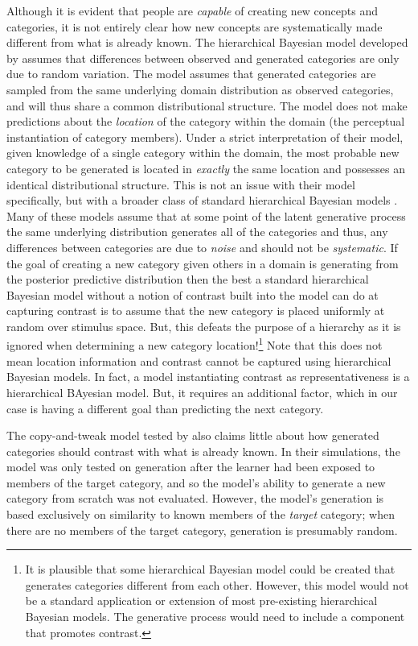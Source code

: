 \documentclass[12pt]{article}
\begin{document}
\begin{flushleft}
Although it is evident that people are {\em capable} of creating new concepts
and categories, it is not entirely clear how new concepts are systematically
made different from what is already known. The hierarchical Bayesian model
developed by \cite{jern2013probabilistic} assumes that differences between
observed and generated categories are only due to random variation. The model
assumes that generated categories are sampled from the same underlying domain
distribution as observed categories, and will thus share a common distributional
structure. The model does not make predictions about the {\em location} of the
category within the domain (the perceptual instantiation of category members).
Under a strict interpretation of their model, given knowledge of a single
category within the domain, the most probable new category to be generated is
located in {\em exactly} the same location and possesses an identical
distributional structure. This is not an issue with their model specifically,
but with a broader class of standard hierarchical Bayesian models \citep[e.g.,
][]{griffithsscn07,kemp07}. Many of these models assume that at some point of
the latent generative process the same underlying distribution generates all of
the categories and thus, any differences between categories are due to {\em
noise} and should not be {\em systematic}. If the goal of creating a new
category given others in a domain is generating from the posterior predictive
distribution then the best a standard hierarchical Bayesian model without a
notion of contrast built into the model can do at capturing contrast is to
assume that the new category is placed uniformly at random over stimulus space.
But, this defeats the purpose of a hierarchy as it is ignored when determining a
new category location!\footnote{It is plausible that some hierarchical Bayesian
model could be created that generates categories different from each other.
However, this model would not be a standard application or extension of most
pre-existing hierarchical Bayesian models. The generative process would need to
include a component that promotes contrast.} Note that this does not mean
location information and contrast cannot be captured using hierarchical Bayesian
models. In fact, a model instantiating contrast as representativeness is a
hierarchical BAyesian model. But, it requires an additional factor, which in our
case is having a different goal than predicting the next category.

The copy-and-tweak model tested by \cite{jern2013probabilistic} also claims
little about how generated categories should contrast with what is already
known. In their simulations, the model was only tested on generation after the
learner had been exposed to members of the target category, and so the model's
ability to generate a new category from scratch was not evaluated. However, the
model's generation is based exclusively on similarity to known members of the
{\em target} category; when there are no members of the target category,
generation is presumably random.


\end{flushleft}
\end{document}
